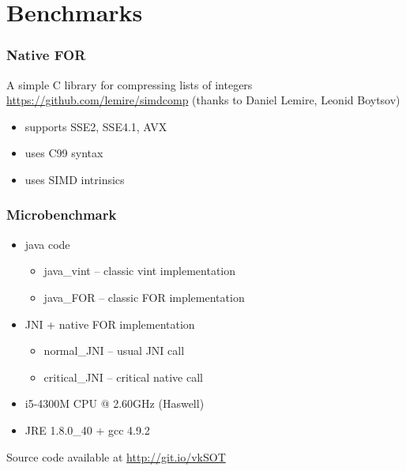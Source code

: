 \documentclass{beamer}
\begin{document}
	\section{Benchmarks}
	\begin{frame}
		\frametitle{Native FOR}
		A simple C library for compressing lists of integers \url{https://github.com/lemire/simdcomp} (thanks to  Daniel Lemire, Leonid Boytsov)
		\begin{itemize}
		\item supports SSE2, SSE4.1, AVX 
		\item uses C99 syntax
		\item uses SIMD intrinsics
		\end{itemize}
	\end{frame}
	\begin{frame}
		\frametitle{Microbenchmark}
		\begin{itemize}
		\item java code
		\begin{itemize}
		\item java\_vint -- classic vint implementation
		\item java\_FOR -- classic FOR implementation
		\end{itemize}
		\item JNI + native FOR implementation
		\begin{itemize}
		\item normal\_JNI -- usual JNI call
		\item critical\_JNI -- critical native call
		\end{itemize}
		\end{itemize}

			\begin{itemize}
				\item i5-4300M CPU @ 2.60GHz (Haswell)
				\item JRE 1.8.0\_40 + gcc 4.9.2
			\end{itemize}
		\vskip15pt
		
		Source code available at \url{http://git.io/vkSOT}\\
	\end{frame}
\end{document}
